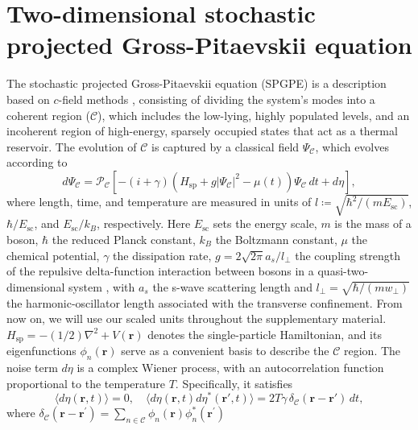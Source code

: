 \documentclass[aps,prl,twocolumn,showpacs,notitlepage,floatfix,superscriptaddress]{revtex4-1}
\begin{document}
\section{Two-dimensional stochastic projected Gross-Pitaevskii equation}
The stochastic projected Gross-Pitaevskii equation (SPGPE) is a description based on $c$-field methods \cite{blakie2008dynamics}, consisting of dividing the system's modes into a coherent region ($\mathcal{C}$), which includes the low-lying, highly populated levels, and an incoherent region of high-energy, sparsely occupied states that act as a thermal reservoir. The evolution of $\mathcal{C}$ is captured by a classical field $\Psi_{\mathcal{C}}$, which evolves according to
\begin{equation}\label{2D_dimensionless_SPGPE}
    d{\Psi_\mathcal{C}} = \mathcal{P}_{\mathcal{C}} \left[ -(i + \gamma) \left( H_{\textrm{sp}} + g |\Psi_\mathcal{C}|^{2} -\mu(t) \right) \Psi_\mathcal{C} \, dt + d \eta \right], 
\end{equation}
where length, time, and temperature are measured in units of $l \coloneqq \sqrt{\hbar^2 / \left( m E_{\textrm{sc}} \right)}$, $\hbar / E_{\textrm{sc}}$, and $E_{\textrm{sc}} / k_B$, respectively. Here $E_{\textrm{sc}}$ sets the energy scale, $m$ is the mass of a boson, $\hbar$ the reduced Planck constant, $k_B$ the Boltzmann constant, $\mu$ the chemical potential, $\gamma$ the dissipation rate, 
$
g 
= 
2 \sqrt{2 \pi} a_s / l_{\perp} 
$ 
the coupling strength of the repulsive delta-function interaction between bosons 
in a quasi-two-dimensional system \cite{pitaevskii2003bose,Bradley2015}, with 
$a_s$ the s-wave scattering length and 
$l_{\perp}=\sqrt{\hbar/(mw_{\perp})}$ the harmonic-oscillator length associated with the transverse confinement. 
From now on, we will use our scaled units throughout the supplementary material. 
$H_{\textrm{sp}}=-(1/2)\nabla^{2}+V(\boldsymbol{r})$ denotes the single-particle Hamiltonian, and its eigenfunctions $\phi_{n}(\boldsymbol{r})$ serve as a convenient basis to describe the $\mathcal{C}$ region. 
The noise term $d\eta$ is a complex Wiener process, with an autocorrelation function proportional to the temperature $T$. Specifically, it satisfies
\begin{equation}
\langle d \eta (\boldsymbol{r}, t) \rangle = 0, \quad \langle d \eta (\boldsymbol{r}, t) d \eta^{*}(\boldsymbol{r}', t) \rangle = 2T\gamma\, \delta_{\mathcal{C}}(\boldsymbol{r} - \boldsymbol{r}')\, dt,
\end{equation}
where $\delta_{\mathcal{C}}(\boldsymbol{r}-\boldsymbol{r}^{\prime})=\sum_{n\in \mathcal{C}}\phi_{n}(\boldsymbol{r})\phi^{*}_{n}(\boldsymbol{r}^{\prime})$
\end{document}
